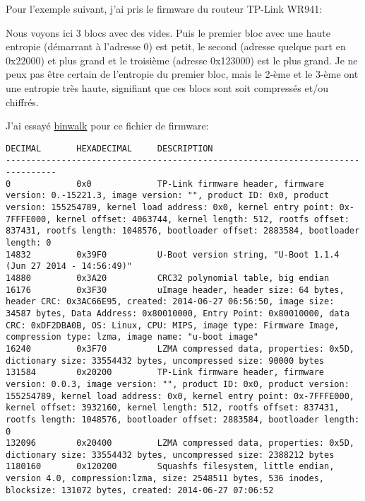 Pour l'exemple suivant, j'ai pris le firmware du routeur TP-Link WR941:



Nous voyons ici 3 blocs avec des vides.
Puis le premier bloc avec une haute entropie (démarrant à l'adresse 0) est petit,
le second (adresse quelque part en 0x22000) et plus grand et le troisième
(adresse 0x123000) est le plus grand.
Je ne peux pas être certain de l'entropie du premier bloc, mais le 2-ème et le 3-ème
ont une entropie très haute, signifiant que ces blocs sont soit compressés et/ou
chiffrés.

J'ai essayé \href{http://binwalk.org/}{binwalk} pour ce fichier de firmware:

\begin{lstlisting}
DECIMAL       HEXADECIMAL     DESCRIPTION
--------------------------------------------------------------------------------
0             0x0             TP-Link firmware header, firmware version: 0.-15221.3, image version: "", product ID: 0x0, product version: 155254789, kernel load address: 0x0, kernel entry point: 0x-7FFFE000, kernel offset: 4063744, kernel length: 512, rootfs offset: 837431, rootfs length: 1048576, bootloader offset: 2883584, bootloader length: 0
14832         0x39F0          U-Boot version string, "U-Boot 1.1.4 (Jun 27 2014 - 14:56:49)"
14880         0x3A20          CRC32 polynomial table, big endian
16176         0x3F30          uImage header, header size: 64 bytes, header CRC: 0x3AC66E95, created: 2014-06-27 06:56:50, image size: 34587 bytes, Data Address: 0x80010000, Entry Point: 0x80010000, data CRC: 0xDF2DBA0B, OS: Linux, CPU: MIPS, image type: Firmware Image, compression type: lzma, image name: "u-boot image"
16240         0x3F70          LZMA compressed data, properties: 0x5D, dictionary size: 33554432 bytes, uncompressed size: 90000 bytes
131584        0x20200         TP-Link firmware header, firmware version: 0.0.3, image version: "", product ID: 0x0, product version: 155254789, kernel load address: 0x0, kernel entry point: 0x-7FFFE000, kernel offset: 3932160, kernel length: 512, rootfs offset: 837431, rootfs length: 1048576, bootloader offset: 2883584, bootloader length: 0
132096        0x20400         LZMA compressed data, properties: 0x5D, dictionary size: 33554432 bytes, uncompressed size: 2388212 bytes
1180160       0x120200        Squashfs filesystem, little endian, version 4.0, compression:lzma, size: 2548511 bytes, 536 inodes, blocksize: 131072 bytes, created: 2014-06-27 07:06:52
\end{lstlisting}

